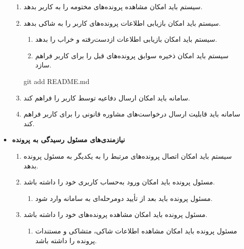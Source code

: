 \documentclass[12pt,a4paper,oneside]{article}
\begin{document}
\begin{itemize}
\begin{enumerate}
        \item 
        سیستم باید امکان مشاهده پرونده‌های مختومه را به کاربر بدهد.

        \item 
        سیستم باید امکان بازیابی اطلاعات پرونده‌های کاربر را به شاکی بدهد.
        \begin{enumerate}
            \renewcommand{\labelenumii}{\textbf{.R\arabic{enumi}.\arabic{enumii}}}
            \item 
            سیستم باید امکان بازیابی اطلاعات ازدست‌رفته و خراب را بدهد.
            \item 
            سیستم باید امکان ذخیره سوابق پرونده‌های قبل را برای کاربر فراهم سازد.
        \end{enumerate}		git add README.md

        \item 
        سامانه باید امکان ارسال دفاعیه توسط کاربر را فراهم کند.

        \item 
        سامانه باید قابلیت ارسال درخواست‌های مشاوره قانونی را برای کاربر فراهم کند.
    \end{enumerate}

    \item
    \textbf{نیازمندی‌های مسئول رسیدگی به پرونده}
    \begin{enumerate}
        \renewcommand{\labelenumi}{\textbf{.R\arabic{enumi}}}
        \setcounter{enumi}{35}

        \item 
        سیستم باید امکان اتصال پرونده‌های مرتبط را به یکدیگر به مسئول پرونده بدهد.

        \item 
        مسئول پرونده باید امکان ورود به‌حساب کاربری خود را داشته باشد.
        \begin{enumerate}
            \renewcommand{\labelenumii}{\textbf{.R\arabic{enumi}.\arabic{enumii}}}
            \item 
            مسئول پرونده باید بعد از تأیید دومرحله‌ای به سامانه وارد شود.
        \end{enumerate}

        \item 
        مسئول پرونده باید امکان مشاهده پرونده‌های خود را داشته باشد.
        \begin{enumerate}
            \renewcommand{\labelenumii}{\textbf{.R\arabic{enumi}.\arabic{enumii}}}
            \item 
            مسئول پرونده باید امکان مشاهده اطلاعات شاکی، متشاکی و مستندات پرونده را داشته باشد.
        \end{enumerate}


\end{enumerate}
\end{itemize}
\end{document}
